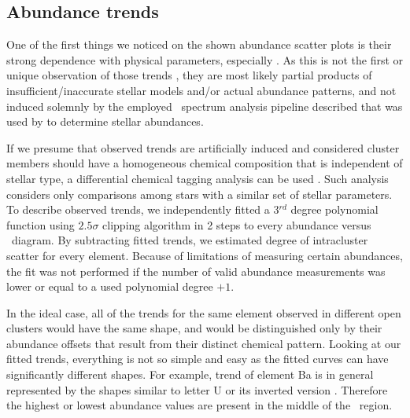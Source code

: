 \subsection{Abundance trends}
\label{sec:abund_trends}
One of the first things we noticed on the shown abundance scatter plots is their strong dependence with physical parameters, especially \Teff. As this is not the first or unique observation of those trends \cite{2010A&A...523A..71G, 2013ApJ...775...58B, 2016MNRAS.457.3934L, 2018A&A...619A.176B, 2019arXiv191208539C}, they are most likely partial products of insufficient/inaccurate stellar models and/or actual abundance patterns, and not induced solemnly by the employed \SME\ spectrum analysis pipeline described that was used by \citet{buder2020} to determine stellar abundances.

If we presume that observed trends are artificially induced and considered cluster members should have a homogeneous chemical composition that is independent of stellar type, a differential chemical tagging analysis can be used \cite{2019arXiv191208539C}. Such analysis considers only comparisons among stars with a similar set of stellar parameters. To describe observed trends, we independently fitted a 3$^{rd}$ degree polynomial function using $2.5\sigma$ clipping algorithm in 2 steps to every abundance versus \Teff\ diagram. By subtracting fitted trends, we estimated degree of intracluster scatter for every element. Because of limitations of measuring certain abundances, the fit was not performed if the number of valid abundance measurements was lower or equal to a used polynomial degree $+1$.

In the ideal case, all of the trends for the same element observed in different open clusters would have the same shape, and would be distinguished only by their abundance offsets that result from their distinct chemical pattern. Looking at our fitted trends, everything is not so simple and easy as the fitted curves can have significantly different shapes. For example, trend of element Ba is in general represented by the shapes similar to letter U or its inverted version \rotU. Therefore the highest or lowest abundance values are present in the middle of the \Teff\ region.


